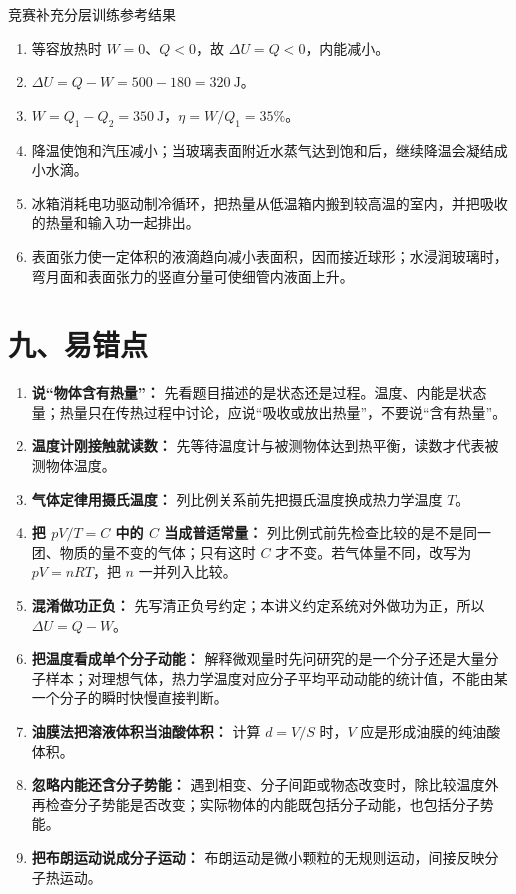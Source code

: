 \begin{learningbox}{竞赛补充分层训练参考结果}
\begin{enumerate}[itemsep=0.45em,topsep=0.3em,parsep=0pt]
  \item 等容放热时 $W=0$、$Q<0$，故 $\Delta U=Q<0$，内能减小。
  \item $\Delta U=Q-W=500-180=320\ \mathrm J$。
  \item $W=Q_1-Q_2=350\ \mathrm J$，$\eta=W/Q_1=35\%$。
  \item 降温使饱和汽压减小；当玻璃表面附近水蒸气达到饱和后，继续降温会凝结成小水滴。
  \item 冰箱消耗电功驱动制冷循环，把热量从低温箱内搬到较高温的室内，并把吸收的热量和输入功一起排出。
  \item 表面张力使一定体积的液滴趋向减小表面积，因而接近球形；水浸润玻璃时，弯月面和表面张力的竖直分量可使细管内液面上升。
\end{enumerate}
\end{learningbox}

\section*{九、易错点}
\begin{mistakebox}
\begin{enumerate}
  \item \textbf{说“物体含有热量”：} 先看题目描述的是状态还是过程。温度、内能是状态量；热量只在传热过程中讨论，应说“吸收或放出热量”，不要说“含有热量”。
  \item \textbf{温度计刚接触就读数：} 先等待温度计与被测物体达到热平衡，读数才代表被测物体温度。
  \item \textbf{气体定律用摄氏温度：} 列比例关系前先把摄氏温度换成热力学温度 $T$。
  \item \textbf{把 $pV/T=C$ 中的 $C$ 当成普适常量：} 列比例式前先检查比较的是不是同一团、物质的量不变的气体；只有这时 $C$ 才不变。若气体量不同，改写为 $pV=nRT$，把 $n$ 一并列入比较。
  \item \textbf{混淆做功正负：} 先写清正负号约定；本讲义约定系统对外做功为正，所以 $\Delta U=Q-W$。
  \item \textbf{把温度看成单个分子动能：} 解释微观量时先问研究的是一个分子还是大量分子样本；对理想气体，热力学温度对应分子平均平动动能的统计值，不能由某一个分子的瞬时快慢直接判断。
  \item \textbf{油膜法把溶液体积当油酸体积：} 计算 $d=V/S$ 时，$V$ 应是形成油膜的纯油酸体积。
  \item \textbf{忽略内能还含分子势能：} 遇到相变、分子间距或物态改变时，除比较温度外再检查分子势能是否改变；实际物体的内能既包括分子动能，也包括分子势能。
  \item \textbf{把布朗运动说成分子运动：} 布朗运动是微小颗粒的无规则运动，间接反映分子热运动。
\end{enumerate}
\end{mistakebox}

